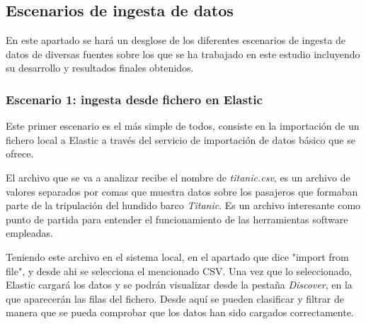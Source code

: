 \paragraph{}
\paragraph{  }
\paragraph{  }
\paragraph{  }
\paragraph{  }
\paragraph{  }


\subsection{Escenarios de ingesta de datos}

En este apartado se hará un desglose de los diferentes escenarios de ingesta de datos de diversas fuentes sobre los que se ha trabajado en este estudio incluyendo su desarrollo y resultados finales obtenidos.

\subsubsection{Escenario 1: ingesta desde fichero en Elastic}
Este primer escenario es el más simple de todos, consiste en la importación de un fichero local a Elastic a través del servicio de importación de datos básico que se ofrece.

El archivo que se va a analizar recibe el nombre de \textit{titanic.csv}, es un archivo de valores separados por comas que muestra datos sobre los pasajeros que formaban parte de la tripulación del hundido barco \textit{Titanic}.
Es un archivo interesante como punto de partida para entender el funcionamiento de las herramientas software empleadas.

Teniendo este archivo en el sistema local, en el apartado que dice "import from file", y desde ahi se selecciona el mencionado CSV. Una vez que lo seleccionado, Elastic cargará los datos y se podrán visualizar desde la pestaña \textit{Discover}, en la que aparecerán las filas del fichero. Desde aquí se pueden clasificar y filtrar de manera que se pueda comprobar que los datos han sido cargados correctamente.

